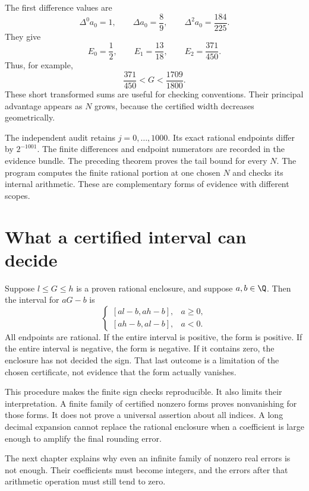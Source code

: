 \begin{example}
The first difference values are
\[
\Delta^0a_0=1,\qquad \Delta a_0=\frac89,\qquad
\Delta^2a_0=\frac{184}{225}.
\]
They give
\[
E_0=\frac12,\qquad E_1=\frac{13}{18},\qquad
E_2=\frac{371}{450}.
\]
Thus, for example,
\[
\frac{371}{450}<G<\frac{1709}{1800}.
\]
These short transformed sums are useful for checking conventions. Their principal advantage appears as $N$ grows, because the certified width decreases geometrically.
\end{example}

The independent audit retains $j=0,\ldots,1000$. Its exact rational endpoints differ by $2^{-1001}$. The finite differences and endpoint numerators are recorded in the evidence bundle. The preceding theorem proves the tail bound for every $N$. The program computes the finite rational portion at one chosen $N$ and checks its internal arithmetic. These are complementary forms of evidence with different scopes.

\section{What a certified interval can decide}

Suppose $l\leq G\leq h$ is a proven rational enclosure, and suppose $a,b\in\Q$. Then the interval for $aG-b$ is
\begin{equation}
\begin{cases}
[al-b,ah-b],&a\geq0,\\
[ah-b,al-b],&a<0.
\end{cases}
\label{eq:c01-linear-interval}
\end{equation}
All endpoints are rational. If the entire interval is positive, the form is positive. If the entire interval is negative, the form is negative. If it contains zero, the enclosure has not decided the sign. That last outcome is a limitation of the chosen certificate, not evidence that the form actually vanishes.

This procedure makes the finite sign checks reproducible. It also limits their interpretation. A finite family of certified nonzero forms proves nonvanishing for those forms. It does not prove a universal assertion about all indices. A long decimal expansion cannot replace the rational enclosure when a coefficient is large enough to amplify the final rounding error.

The next chapter explains why even an infinite family of nonzero real errors is not enough. Their coefficients must become integers, and the errors after that arithmetic operation must still tend to zero.

